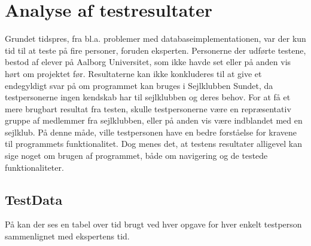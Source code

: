 \section{Analyse af testresultater}

Grundet tidspres, fra bl.a. problemer med databaseimplementationen, var der kun tid til at teste på fire personer, foruden eksperten.
Personerne der udførte testene, bestod af elever på Aalborg Universitet, som ikke havde set eller på anden vis hørt om projektet før.
Resultaterne kan ikke konkluderes til at give et endegyldigt svar på om programmet kan bruges i Sejlklubben Sundet, da testpersonerne ingen kendskab har til sejlklubben og deres behov.
For at få et mere brugbart resultat fra testen, skulle testpersonerne være en repræsentativ gruppe af medlemmer fra sejlklubben, eller på anden vis være indblandet med en sejlklub. 
På denne måde, ville testpersonen have en bedre forståelse for kravene til programmets funktionalitet.
Dog menes det, at testens resultater alligevel kan sige noget om brugen af programmet, både om navigering og de testede funktionaliteter.

\subsection{TestData}
På  kan der ses en tabel over tid brugt ved hver opgave for hver enkelt testperson sammenlignet med ekspertens tid.

